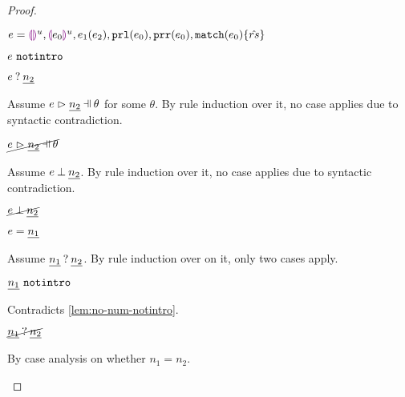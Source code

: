 \begin{proof}
\begin{byCases}
\begin{byCases}
        \begin{pfsteps*}
        \item $e=\textcolor{violet}{\llparenthesis}\textcolor{violet}{\rrparenthesis}^{u},\textcolor{violet}{\llparenthesis} e_0\textcolor{violet}{\rrparenthesis}^{u},e_1(e_2),\mathtt{prl}(e_0),\mathtt{prr}(e_0),\mathtt{match}(e_0) \{\hat{rs}\}$ 
        \item $e ~\mathtt{notintro}$  
        \item $e \mathbin{?} \underline{n_2}$ 
        \end{pfsteps*}
        Assume $\hpatmatch{e}{\hnum{n_2}}{\theta}$ for some $\theta$. By rule induction over it, no case applies due to syntactic contradiction.
        \begin{pfsteps*}
        \item $\cancel{\hpatmatch{e}{\hnum{n_2}}{\theta}}$ 
        \end{pfsteps*}
        Assume $e \mathbin{\bot} \underline{n_2}$. By rule induction over it, no case applies due to syntactic contradiction.
        \begin{pfsteps*}
        \item $\cancel{e \mathbin{\bot} \underline{n_2}}$ 
        \end{pfsteps*}
    \item[\text{(\ref{rule:TNum})}]
        \begin{pfsteps*}
        \item $e=\underline{n_1}$
        \end{pfsteps*}
        Assume $\underline{n_1} \mathbin{?} \underline{n_2}$. By rule induction over  on it, only two cases apply.
        \begin{byCases}
        \item[\text{(\ref{rule:MMNotIntro})}]
            \begin{pfsteps*}
            \item $\underline{n_1} ~\mathtt{notintro}$ 
            \end{pfsteps*}
            Contradicts \autoref{lem:no-num-notintro}.
        \end{byCases}
        \begin{pfsteps*}
        \item $\cancel{\underline{n_1} \mathbin{?} \underline{n_2}}$ 
        \end{pfsteps*}
        By case analysis on whether $n_1=n_2$.

\end{byCases}
\end{byCases}
\end{proof}
